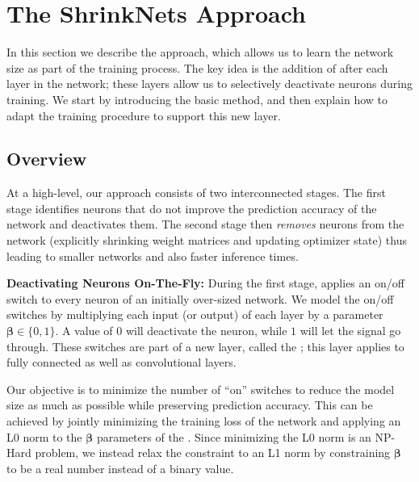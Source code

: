 
\section{The ShrinkNets Approach}

In this section we describe the \shrink approach, which allows us to learn
the network size as part of the training process. The key idea is the addition
of \swls after each layer in the network;  these layers
allow us to selectively deactivate neurons during training.  We start by introducing the
basic method, and then explain how to adapt the training procedure to support this new
layer. 

\subsection{Overview}

At a high-level, our approach consists of two interconnected stages.
The first stage identifies neurons that do not improve the
prediction accuracy of the network and deactivates them. 
The second stage then {\it removes} neurons from the network (explicitly
shrinking weight matrices and updating optimizer state) thus leading to 
smaller networks and also faster inference times. 

\noindent\textbf{Deactivating Neurons On-The-Fly: }During the first stage,
\shrink applies an on/off switch to every neuron of an initially over-sized
network. We model the on/off switches by multiplying each input (or output) of
each layer by a parameter $\bm{\beta}\in\{0,1\}$. A value of $0$
will deactivate the neuron, while $1$ will let the signal go through. These
switches are part of a new layer, called the \swl; this layer applies 
to fully connected as well as convolutional layers.

Our objective is to minimize the number of ``on'' switches to reduce the model size as much
as possible while preserving prediction accuracy. This can be achieved by jointly
minimizing the training loss of the network and applying an L0 norm to the 
$\bm{\beta}$ parameters of the \swl. 
Since minimizing the L0 norm is an NP-Hard problem, we instead relax the constraint
to an L1 norm by constraining $\bm{\beta}$ to be a real number
instead of a binary value.

